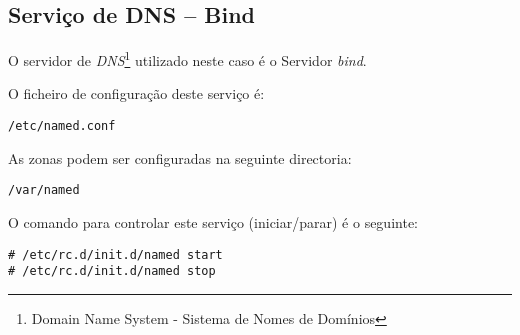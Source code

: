 \subsection{Serviço de DNS -- Bind}

O servidor de \emph{DNS}\footnote{Domain Name System - Sistema de Nomes de Domínios} utilizado neste caso é o Servidor \emph{bind}.

O ficheiro de configuração deste serviço é:

\begin{Verbatim}[commandchars=\\\{\}]
/etc/named.conf
\end{Verbatim}

As zonas podem ser configuradas na seguinte directoria:

\begin{Verbatim}[commandchars=\\\{\}]
/var/named
\end{Verbatim}

O comando para controlar este serviço (iniciar/parar) é o seguinte:

\begin{Verbatim}[commandchars=\\\{\}]
# /etc/rc.d/init.d/named start
# /etc/rc.d/init.d/named stop
\end{Verbatim}

